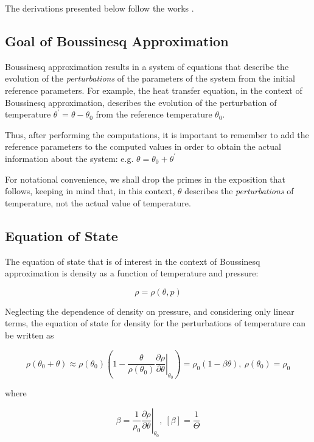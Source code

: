 The derivations presented below follow the works \cite{convective_stability, boussinesq_validity}.

\subsection{Goal of Boussinesq Approximation}

Boussinesq approximation results in a system of equations that describe the evolution of the \emph{perturbations} of the parameters of the system from the initial reference parameters. For example, the heat transfer equation, in the context of Boussinesq approximation, describes the evolution of the perturbation of temperature $\theta^{\prime} = \theta - \theta_0$ from the reference temperature $\theta_0$. 

Thus, after performing the computations, it is important to remember to add the reference parameters to the computed values in order to obtain the actual information about the system: e.g. $\theta = \theta_0 + \theta^{\prime}$ 

For notational convenience, we shall drop the primes in the exposition that follows, keeping in mind that, in this context, $\theta$ describes the \emph{perturbations} of temperature, not the actual value of temperature.

\subsection{Equation of State}

The equation of state that is of interest in the context of Boussinesq approximation is density as a function of temperature and pressure:

$$ \rho = \rho(\theta, p) $$ 

Neglecting the dependence of density on pressure, and considering only linear terms, the equation of state for density for the perturbations of temperature can be written as

\begin{equation} \label{density}
\rho(\theta_0 + \theta) \approx \rho(\theta_0)(1 - \left. \frac{\theta}{\rho(\theta_0)}\frac{\partial \rho}{\partial \theta} \right|_{\theta_0}) = \rho_0(1 - \beta\theta), ~ \rho(\theta_0) = \rho_0
\end{equation}

where 

$$ \beta = \left. \frac{1}{\rho_0}\frac{\partial \rho}{\partial \theta} \right|_{\theta_0}, ~ [\beta] = \frac{1}{\Theta}$$

